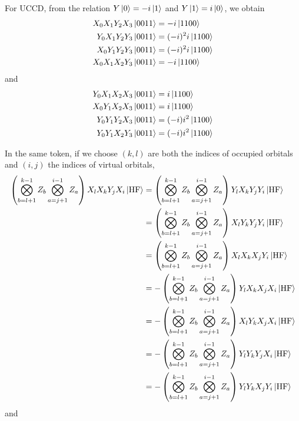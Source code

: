 \documentclass[11pt, oneside]{article}   	%
\begin{document}
For UCCD, from the relation $Y \ket{0} = -i \ket{1}$ and $Y \ket{1} = i \ket{0}$, we obtain
\begin{align}
X_0 X_1 Y_2 X_3 \ket{0011} &= - i \ket{1100} \\
Y_0 X_1 Y_2 Y_3 \ket{0011} &= (-i)^2 i \ket{1100} \\
X_0 Y_1 Y_2 Y_3 \ket{0011} &= (-i)^2 i \ket{1100} \\
X_0 X_1 X_2 Y_3 \ket{0011} &= - i \ket{1100}
\end{align}
and 
\begin{align}
Y_0 X_1 X_2 X_3 \ket{0011} &= i \ket{1100} \\
X_0 Y_1 X_2 X_3 \ket{0011} &= i \ket{1100} \\
Y_0 Y_1 Y_2 X_3 \ket{0011} &= (-i) i^2 \ket{1100} \\
Y_0 Y_1 X_2 Y_3 \ket{0011} &= (-i) i^2 \ket{1100}
\end{align}

In the same token, if we choose $(k, l)$ are both the indices of occupied orbitals and $(i, j)$ the indices of virtual orbitals, 
\begin{align}
\left( \bigotimes^{k-1}_{b=l+1} Z_b \bigotimes^{i-1}_{a=j+1} Z_a \right) X_l X_k Y_j X_i \ket{\mathrm{HF}}
& = \left( \bigotimes^{k-1}_{b=l+1} Z_b \bigotimes^{i-1}_{a=j+1} Z_a \right) Y_l X_k Y_j Y_i \ket{\mathrm{HF}} \\
& = \left( \bigotimes^{k-1}_{b=l+1} Z_b \bigotimes^{i-1}_{a=j+1} Z_a \right) X_l Y_k Y_j Y_i \ket{\mathrm{HF}} \\
& = \left( \bigotimes^{k-1}_{b=l+1} Z_b \bigotimes^{i-1}_{a=j+1} Z_a \right) X_l X_k X_j Y_i \ket{\mathrm{HF}} \\
& = - \left( \bigotimes^{k-1}_{b=l+1} Z_b \bigotimes^{i-1}_{a=j+1} Z_a \right) Y_l X_k X_j X_i \ket{\mathrm{HF}} \\
& = - \left( \bigotimes^{k-1}_{b=l+1} Z_b \bigotimes^{i-1}_{a=j+1} Z_a \right) X_l Y_k X_j X_i \ket{\mathrm{HF}} \\
& = - \left( \bigotimes^{k-1}_{b=l+1} Z_b \bigotimes^{i-1}_{a=j+1} Z_a \right) Y_l Y_k Y_j X_i \ket{\mathrm{HF}} \\
& = - \left( \bigotimes^{k-1}_{b=l+1} Z_b \bigotimes^{i-1}_{a=j+1} Z_a \right) Y_l Y_k X_j Y_i \ket{\mathrm{HF}}
\end{align}
and 
\end{document}
